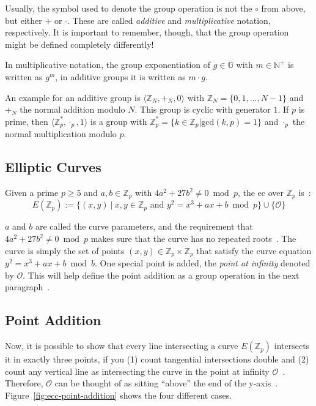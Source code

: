 Usually, the symbol used to denote the group operation is not the $\circ$ from above, but either $+$ or $\cdot$. These are called \emph{additive} and \emph{multiplicative} notation, respectively.
It is important to remember, though, that the group operation might be defined completely differently!

In multiplicative notation, the group exponentiation of $g \in \mathbb{G}$ with $m \in \mathbb{N}^+$ is written as $g^m$, in additive groups it is written as $m \cdot g$.

An example for an additive group is $\langle \mathbb{Z}_N, +_N, 0 \rangle$ with $\mathbb{Z}_N = \{0, 1, \dots, N-1\}$ and $+_N$ the normal addition modulo $N$.
This group is cyclic with generator $1$.
If $p$ is prime, then $\langle \mathbb{Z}^*_p, \cdot_p, 1 \rangle$ is a group with $\mathbb{Z}^*_p = \{k \in \mathbb{Z}_p | \text{gcd}(k,p) = 1\}$ and $\cdot_p$ the normal multiplication modulo $p$.

\subsection{Elliptic Curves}

\begin{definition}
    Given a prime $p \geq 5$ and $a, b \in \mathbb{Z}_p$ with $4a^2 + 27b^2 \neq 0 \bmod{p}$, the \gls{ec} over $\mathbb{Z}_p$ is~\cite{katz_introduction_2015}:
    \begin{equation}
        E(\mathbb{Z}_p) := \{(x, y)~|~x,y \in \mathbb{Z}_p \text{ and } y^2 = x^3 + a x + b \bmod{p}\} \cup \{\mathcal{O}\}
    \end{equation}
\end{definition}

$a$ and $b$ are called the curve parameters, and the requirement that $4a^2 + 27b^2 \neq 0 \bmod{p}$ makes sure that the curve has no repeated roots~\cite{katz_introduction_2015}.
The curve is simply the set of points $(x, y) \in \mathbb{Z}_p \times \mathbb{Z}_p$ that satisfy the curve equation $y^2 = x^3 + a x + b \bmod{b}$.
One special point is added, the \emph{point at infinity} denoted by $\mathcal{O}$.
This will help define the point addition as a group operation in the next paragraph~\cite{katz_introduction_2015}.

\subsection{Point Addition}
Now, it is possible to show that every line intersecting a curve $E(\mathbb{Z}_p)$ intersects it in exactly three points, if you (1) count tangential intersections double and (2) count any vertical line as intersecting the curve in the point at infinity $\mathcal{O}$~\cite{katz_introduction_2015}.
Therefore, $\mathcal{O}$ can be thought of as sitting ``above'' the end of the y-axis~\cite{katz_introduction_2015}.
Figure~\ref{fig:ecc-point-addition} shows the four different cases.

